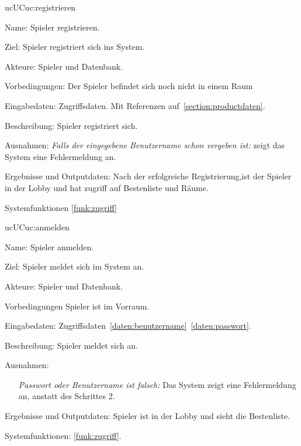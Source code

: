\begin{description}[leftmargin=5em, style=sameline]

	\begin{lhp}{uc}{UC}{uc:registrieren}
		\item [Name:]Spieler registrieren. 
		\item [Ziel:] Spieler registriert sich ins System.
		\item [Akteure:] Spieler und Datenbank.
		\item [Vorbedingungen:] Der Spieler befindet sich noch nicht in einem Raum
		\item [Eingabedaten:] Zugriffsdaten. Mit Referenzen auf~\ref{section:productdaten}.
		\item [Beschreibung:] Spieler registriert sich.
		\item [Ausnahmen:] \textit{Falls der eingegebene Benutzername schon vergeben ist: } zeigt das System eine Fehlermeldung an.
		\item [Ergebnisse und Outputdaten:] Nach der erfolgreiche Registrierung,ist der Spieler in der Lobby und hat zugriff auf Bestenliste und Räume.
		\item [Systemfunktionen] \ref{funk:zugriff}
	\end{lhp}
	
	\begin{lhp}{uc}{UC}{uc:anmelden}
		\item [Name:] Spieler anmelden.
		\item [Ziel:] Spieler meldet sich im System an.
		\item [Akteure:] Spieler und Datenbank.
		\item [Vorbedingungen] Spieler ist im Vorraum.
		\item [Eingabedaten:] Zugriffsdaten~\ref{daten:benutzername}~\ref{daten:passwort}.
		\item [Beschreibung:] Spieler meldet sich an.							
		\item [Ausnahmen:] \hfill
			\begin{itemize} 
				\item[] \textit{Passwort oder Benutzername ist falsch:} Das System zeigt eine Fehlermeldung an, anstatt des Schrittes 2.
				
			\end{itemize}
		\item [Ergebnisse und Outputdaten:] Spieler ist in der Lobby und sieht die Bestenliste.	
		\item [Systemfunktionen:] \ref{funk:zugriff}.
	\end{lhp}
	

\end{description}
